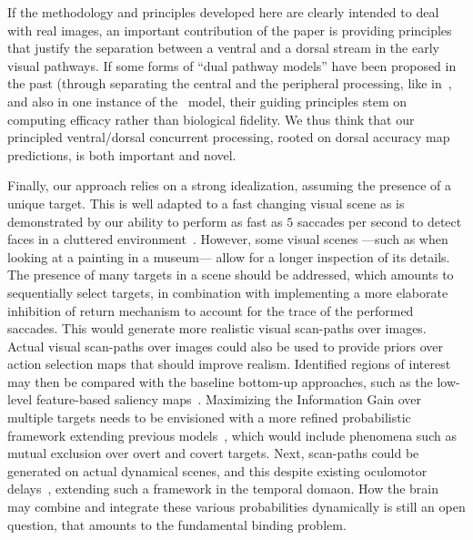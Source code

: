 If the methodology and principles developed here are clearly intended to deal with real images, an important contribution of the paper is providing principles that justify the separation between a ventral and a dorsal stream in the early visual pathways. If some forms of ``dual pathway models'' have been proposed in the past (through separating the central and the peripheral processing, like in~\cite{denil2012learning}, and also in one instance of the~\cite{akbas2017object} model, their guiding principles stem on computing efficacy rather than biological fidelity. We thus think that our principled ventral/dorsal concurrent processing, rooted on dorsal accuracy map predictions, is both important and novel.

Finally, our approach relies on a strong idealization, assuming the presence of a unique target. This is well adapted to a fast changing visual scene as is demonstrated by our ability to perform as fast as $5$ saccades per second to detect faces in a cluttered environment~\cite{Martin18}. However, some visual scenes ---such as when looking at a painting in a museum--- allow for a longer inspection of its details. The presence of many targets in a scene should be addressed, which amounts to sequentially select targets, in combination with implementing a more elaborate inhibition of return mechanism to account for the trace of the performed saccades. This would generate more realistic visual scan-paths over images. Actual visual scan-paths over images could also be used to provide priors over action selection maps that should improve realism. Identified regions of interest may then be compared with the baseline bottom-up approaches, such as the low-level feature-based saliency maps~\cite{Itti01}. Maximizing the Information Gain over multiple targets needs to be envisioned with a more refined probabilistic framework extending previous models~\cite{Friston12}, which would include phenomena such as mutual exclusion over overt and covert targets. Next, scan-paths could be generated on actual dynamical scenes, and this despite existing oculomotor delays~\cite{PerrinetAdamsFriston14}, extending such a framework in the temporal domaon. How the brain may combine and integrate these various probabilities dynamically is still an open question, that amounts to the fundamental binding problem.
%
